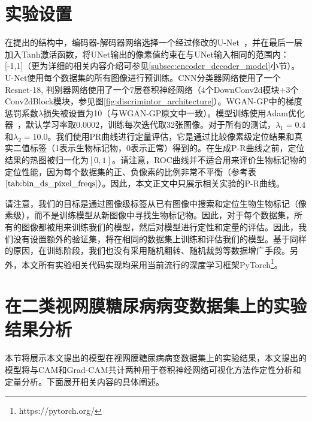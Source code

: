 \section{实验设置}\label{sec:exper_setting}
在提出的结构中，编码器-解码器网络选择一个经过修改的U-Net~\cite{iglovikov2018ternausnet}，并在最后一层加入Tanh激活函数，将UNet输出的像素值约束在与UNet输入相同的范围内：[-1,1]（更为详细的相关内容介绍可参见\ref{subsec:encoder_decoder_model}小节）。U-Net使用每个数据集的所有图像进行预训练。CNN分类器网络使用了一个Resnet-18, 判别器网络使用了一个$7$层卷积神经网络（$4$个DownConv2d模块+$3$个Conv2dBlock模块，参见图\ref{fig:discrimintor_architecture}）。WGAN-GP中的梯度惩罚系数$\lambda$损失被设置为10（与WGAN-GP原文中一致）。模型训练使用Adam优化器~\cite{kingma2014adam}，默认学习率取$0.0002$，训练每次迭代取32张图像。对于所有的测试，$\lambda_1 = 0.4$和$\lambda_{2} = 10.0$。我们使用PR曲线进行定量评估，它是通过比较像素级定位结果和真实二值标签（1表示生物标记物，0表示正常）得到的。在生成P-R曲线之前，定位结果的热图被归一化为$[0,1]$。请注意，ROC曲线并不适合用来评价生物标记物的定位性能，因为每个数据集的正、负像素的比例非常不平衡（参考表$\ref{tab:bin_ds_pixel_freqs}$）。因此，本文正文中只展示相关实验的P-R曲线。

请注意，我们的目标是通过图像级标签从已有图像中搜索和定位生物生物标记（像素级），而不是训练模型从新图像中寻找生物标记物。因此，对于每个数据集，所有的图像都被用来训练我们的模型，然后对模型进行定性和定量的评估。因此，我们没有设置额外的验证集，将在相同的数据集上训练和评估我们的模型。基于同样的原因，在训练阶段，我们也没有采用随机翻转、随机裁剪等数据增广手段。另外，本文所有实验相关代码实现均采用当前流行的深度学习框架PyTorch\footnote{https://pytorch.org/}。

\section{在二类视网膜糖尿病病变数据集上的实验结果分析}\label{sec:bin_dr_ds_experiment}
本节将展示本文提出的模型在视网膜糖尿病病变数据集上的实验结果，本文提出的模型将与CAM和Grad-CAM共计两种用于卷积神经网络可视化方法作定性分析和定量分析。下面展开相关内容的具体阐述。

